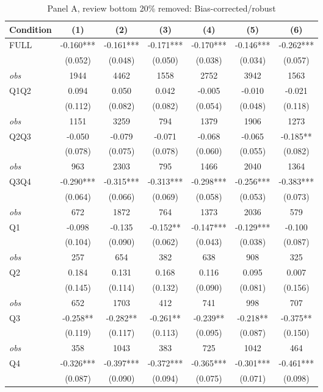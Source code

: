 \begin{table}[!htbp]
\centering
\caption{Panel A, review bottom 20\% removed: Bias-corrected/robust}
\begin{tabular}{lcccccc}
\toprule
Condition & (1) & (2) & (3) & (4) & (5) & (6) \\
\midrule
FULL & -0.160*** & -0.161*** & -0.171*** & -0.170*** & -0.146*** & -0.262*** \\
 & (0.052) & (0.048) & (0.050) & (0.038) & (0.034) & (0.057) \\
\textit{obs} & 1944 & 4462 & 1558 & 2752 & 3942 & 1563 \\
Q1Q2 & 0.094 & 0.050 & 0.042 & -0.005 & -0.010 & -0.021 \\
 & (0.112) & (0.082) & (0.082) & (0.054) & (0.048) & (0.118) \\
\textit{obs} & 1151 & 3259 & 794 & 1379 & 1906 & 1273 \\
Q2Q3 & -0.050 & -0.079 & -0.071 & -0.068 & -0.065 & -0.185** \\
 & (0.078) & (0.075) & (0.078) & (0.060) & (0.055) & (0.082) \\
\textit{obs} & 963 & 2303 & 795 & 1466 & 2040 & 1364 \\
Q3Q4 & -0.290*** & -0.315*** & -0.313*** & -0.298*** & -0.256*** & -0.383*** \\
 & (0.064) & (0.066) & (0.069) & (0.058) & (0.053) & (0.073) \\
\textit{obs} & 672 & 1872 & 764 & 1373 & 2036 & 579 \\
Q1 & -0.098 & -0.135 & -0.152** & -0.147*** & -0.129*** & -0.100 \\
 & (0.104) & (0.090) & (0.062) & (0.043) & (0.038) & (0.087) \\
\textit{obs} & 257 & 654 & 382 & 638 & 908 & 325 \\
Q2 & 0.184 & 0.131 & 0.168 & 0.116 & 0.095 & 0.007 \\
 & (0.145) & (0.114) & (0.132) & (0.090) & (0.081) & (0.156) \\
\textit{obs} & 652 & 1703 & 412 & 741 & 998 & 707 \\
Q3 & -0.258** & -0.282** & -0.261** & -0.239** & -0.218** & -0.375** \\
 & (0.119) & (0.117) & (0.113) & (0.095) & (0.087) & (0.150) \\
\textit{obs} & 358 & 1043 & 383 & 725 & 1042 & 464 \\
Q4 & -0.326*** & -0.397*** & -0.372*** & -0.365*** & -0.301*** & -0.461*** \\
 & (0.087) & (0.090) & (0.094) & (0.075) & (0.071) & (0.098) \\

\end{tabular}
\end{table}
